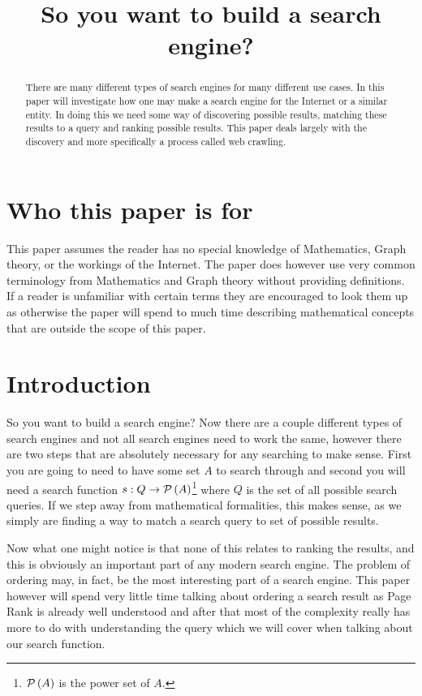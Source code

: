 \documentclass{article}
\title{So you want to build a search engine?}
\begin{document}
	\maketitle
	
	\tableofcontents
	
	\begin{abstract}
		There are many different types of search engines for many different use cases. In this paper will investigate how one may make a search engine for the Internet or a similar entity. In doing this we need some way of discovering possible results, matching these results to a query and ranking possible results. This paper deals largely with the discovery and more specifically a process called web crawling.
	\end{abstract}
	
	\section{Who this paper is for}
	This paper assumes the reader has no special knowledge of Mathematics, Graph theory, or the workings of the Internet. The paper does however use very common terminology from Mathematics and Graph theory without providing definitions. If a reader is unfamiliar with certain terms they are encouraged to look them up as otherwise the paper will spend to much time describing mathematical concepts that are outside the scope of this paper.
	
	\section{Introduction}
	So you want to build a search engine? Now there are a couple different types of search engines and not all search engines need to work the same, however there are two steps that are absolutely necessary for any searching to make sense. First you are going to need to have some set $A$ to search through and second you will need a search function $s:Q\to\mathcal P\left( {A} \right)$\footnote{$\mathcal P\left( {A} \right)$ is the power set of $A$.} where $Q$ is the set of all possible search queries. If we step away from mathematical formalities, this makes sense, as we simply are finding a way to match a search query to set of possible results.
	
	Now what one might notice is that none of this relates to ranking the results, and this is obviously an important part of any modern search engine. The problem of ordering may, in fact, be the most interesting part of a search engine. This paper however will spend very little time talking about ordering a search result as Page Rank is already well understood and after that most of the complexity really has more to do with understanding the query which we will cover when talking about our search function.
	
\end{document}
